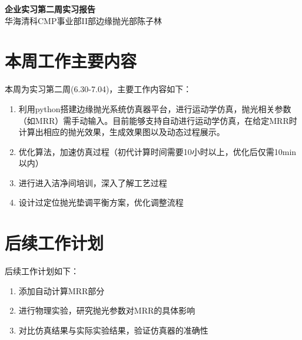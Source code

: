 \documentclass[11pt]{article}
\begin{document}
\begin{center}
    \LARGE \textbf{企业实习\;第二周实习报告}\\
    \vspace{10pt}
    \normalsize 华海清科CMP事业部II部边缘抛光部\;\;陈子林
\end{center}

\section{本周工作主要内容}
本周为实习第二周(6.30-7.04)，主要工作内容如下：
\begin{enumerate}
    \item 利用python搭建边缘抛光系统仿真器平台，进行运动学仿真，抛光相关参数（如MRR）需手动输入。目前能够支持自动进行运动学仿真，在给定MRR时计算出相应的抛光效果，生成效果图以及动态过程展示。
    \item 优化算法，加速仿真过程（初代计算时间需要10小时以上，优化后仅需10min以内）
    \item 进行进入洁净间培训，深入了解工艺过程
    \item 设计过定位抛光垫调平衡方案，优化调整流程
\end{enumerate}

\section{后续工作计划}
后续工作计划如下：
\begin{enumerate}
    \item 添加自动计算MRR部分
    \item 进行物理实验，研究抛光参数对MRR的具体影响
    \item 对比仿真结果与实际实验结果，验证仿真器的准确性
\end{enumerate}

\end{document}
